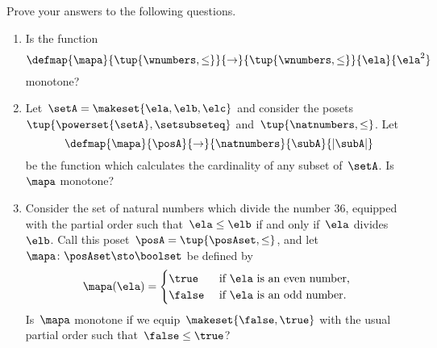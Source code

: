 \clearpage
\vfill
\begin{gradedexercise}
    \label{ex:MonotoneMapCheck?}

    Prove your answers to the following questions.
    \begin{enumerate}
        \item Is the function
              \begin{equation}
                  \defmap{\mapa}{\tup{\wnumbers, \leq}}{\to}{\tup{\wnumbers, \leq}}{\ela}{\ela^2}
              \end{equation}
              monotone?
        \item Let~$\setA = \makeset{\ela, \elb, \elc}$ and consider the posets~$\tup{\powerset{\setA}, \setsubseteq}$ and~$\tup{\natnumbers, \leq}$.
              Let
              \begin{equation}
                  \defmap{\mapa}{\posA}{\to}{\natnumbers}{\subA}{\vert \subA \vert}
              \end{equation}
              be the function which calculates the cardinality of any subset of~$\setA$.
              Is~$\mapa$ monotone?
        \item Consider the set of natural numbers which divide the number 36, equip\-ped with the partial order such that~$\ela \leq \elb$ if and only if~$\ela$ divides~$\elb$.
              Call this poset~$\posA = \tup{\posAset, \leq}$, and let~$\mapa \colon \posAset \sto \boolset$ be defined by
              \begin{equation}
                  \mapa(\ela) =
                  \begin{cases}
                      \true  & \text{ if } \ela \text{ is an even number, } \\
                      \false & \text{ if } \ela \text{ is an odd number.
                      }
                  \end{cases}
              \end{equation}
              Is~$\mapa$ monotone if we equip~$\makeset{\false, \true}$ with the usual partial order such that~$\false \leq \true$?
    \end{enumerate}
\end{gradedexercise}

